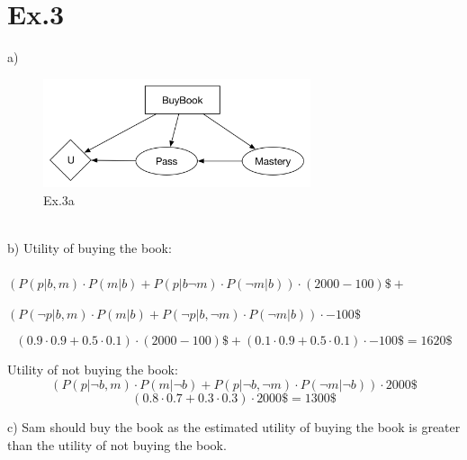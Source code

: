\documentclass[11pt]{article}
\begin{document}
\section*{Ex.3}
a) \\
\begin{figure}[ht]
	\centering
  \includegraphics[width=0.7\textwidth]{DecisionNetwork}
	\caption{Ex.3a}
	\label{fig:3}
\end{figure}
\\
b) Utility of buying the book: \\ \\
$(P(p|b,m) \cdot P(m|b) + P(p|b\neg m) \cdot P(\neg m|b)) \cdot (2000-100)\$ + $

$(P(\neg p|b, m) \cdot P(m|b) + P(\neg p|b,\neg m) \cdot P(\neg m|b)) \cdot -100\$$

$$(0.9 \cdot 0.9 + 0.5 \cdot 0.1) \cdot (2000-100)\$ +  (0.1 \cdot 0.9 + 0.5 \cdot 0.1) \cdot -100\$ = 1620\$ $$

Utility of not buying the book:
$$(P(p|\neg b,m) \cdot P(m|\neg b) + P(p|\neg b, \neg m) \cdot P(\neg m|\neg b)) \cdot 2000\$ $$
$$ (0.8 \cdot 0.7 + 0.3 \cdot 0.3) \cdot 2000\$ = 1300\$$$

c) Sam should buy the book as the estimated utility of buying the book is greater than the utility of not buying the book. 
\end{document}

